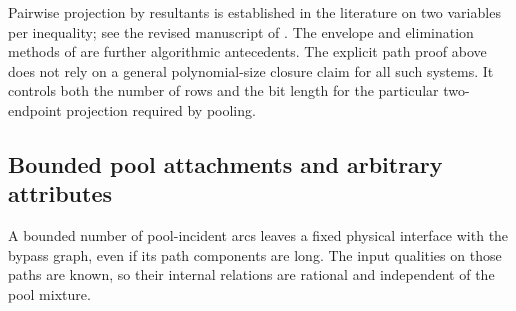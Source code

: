 Pairwise projection by resultants is established in the literature on
two variables per inequality; see the revised manuscript of
\citet[Section~3]{s4:simon2010}. The envelope and elimination methods
of \citet[Section~2]{s4:hochbaum1994} are further algorithmic
antecedents. The explicit path proof above does not rely on a general
polynomial-size closure claim for all such systems. It controls both
the number of rows and the bit length for the particular two-endpoint
projection required by pooling.

\subsection{Bounded pool attachments and arbitrary attributes}
\label{s4:attachments}

A bounded number of pool-incident arcs leaves a fixed physical
interface with the bypass graph, even if its path components are long.
The input qualities on those paths are known, so their internal
relations are rational and independent of the pool mixture.

